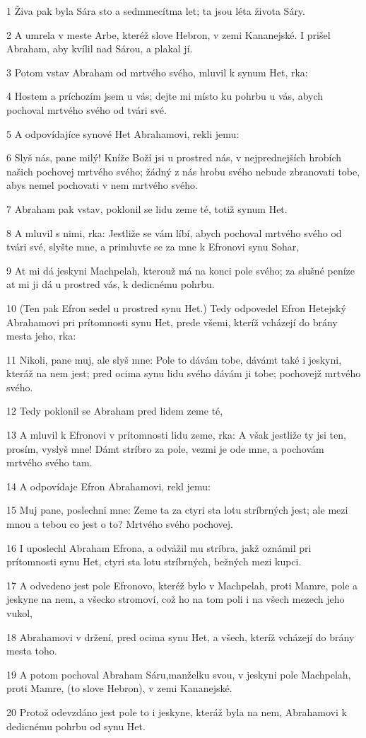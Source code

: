 \par 1 Živa pak byla Sára sto a sedmmecítma let; ta jsou léta života Sáry.
\par 2 A umrela v meste Arbe, kteréž slove Hebron, v zemi Kananejské. I prišel Abraham, aby kvílil nad Sárou, a plakal jí.
\par 3 Potom vstav Abraham od mrtvého svého, mluvil k synum Het, rka:
\par 4 Hostem a príchozím jsem u vás; dejte mi místo ku pohrbu u vás, abych pochoval mrtvého svého od tvári své.
\par 5 A odpovídajíce synové Het Abrahamovi, rekli jemu:
\par 6 Slyš nás, pane milý! Kníže Boží jsi u prostred nás, v nejprednejších hrobích našich pochovej mrtvého svého; žádný z nás hrobu svého nebude zbranovati tobe, abys nemel pochovati v nem mrtvého svého.
\par 7 Abraham pak vstav, poklonil se lidu zeme té, totiž synum Het.
\par 8 A mluvil s nimi, rka: Jestliže se vám líbí, abych pochoval mrtvého svého od tvári své, slyšte mne, a primluvte se za mne k Efronovi synu Sohar,
\par 9 At mi dá jeskyni Machpelah, kterouž má na konci pole svého; za slušné peníze at mi ji dá u prostred vás, k dedicnému pohrbu.
\par 10 (Ten pak Efron sedel u prostred synu Het.) Tedy odpovedel Efron Hetejský Abrahamovi pri prítomnosti synu Het, prede všemi, kteríž vcházejí do brány mesta jeho, rka:
\par 11 Nikoli, pane muj, ale slyš mne: Pole to dávám tobe, dávámt také i jeskyni, kteráž na nem jest; pred ocima synu lidu svého dávám ji tobe; pochovejž mrtvého svého.
\par 12 Tedy poklonil se Abraham pred lidem zeme té,
\par 13 A mluvil k Efronovi v prítomnosti lidu zeme, rka: A však jestliže ty jsi ten, prosím, vyslyš mne! Dámt stríbro za pole, vezmi je ode mne, a pochovám mrtvého svého tam.
\par 14 A odpovídaje Efron Abrahamovi, rekl jemu:
\par 15 Muj pane, poslechni mne: Zeme ta za ctyri sta lotu stríbrných jest; ale mezi mnou a tebou co jest o to? Mrtvého svého pochovej.
\par 16 I uposlechl Abraham Efrona, a odvážil mu stríbra, jakž oznámil pri prítomnosti synu Het, ctyri sta lotu stríbrných, bežných mezi kupci.
\par 17 A odvedeno jest pole Efronovo, kteréž bylo v Machpelah, proti Mamre, pole a jeskyne na nem, a všecko stromoví, což ho na tom poli i na všech mezech jeho vukol,
\par 18 Abrahamovi v držení, pred ocima synu Het, a všech, kteríž vcházejí do brány mesta toho.
\par 19 A potom pochoval Abraham Sáru,manželku svou, v jeskyni pole Machpelah, proti Mamre, (to slove Hebron), v zemi Kananejské.
\par 20 Protož odevzdáno jest pole to i jeskyne, kteráž byla na nem, Abrahamovi k dedicnému pohrbu od synu Het.

